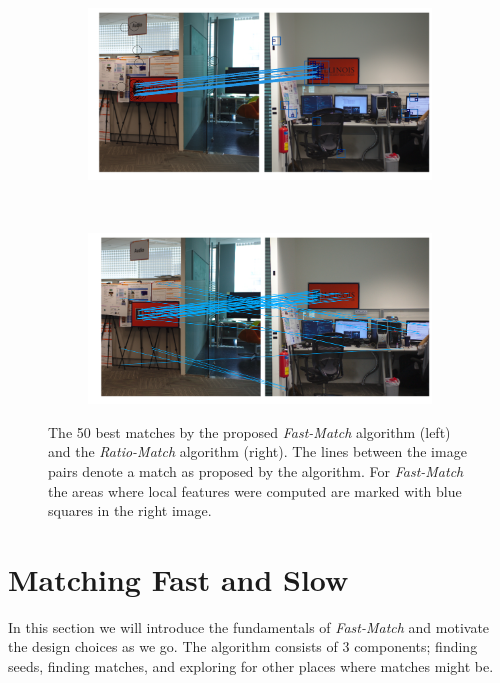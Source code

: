\documentclass[runningheads]{llncs}
\begin{document}
\begin{figure}[tb]
    \centering
    \begin{subfigure}[t]{0.5\columnwidth}
        \includegraphics[width=1\columnwidth]{images/Illinois-fastmatch}
    \end{subfigure}%
    ~%
    \begin{subfigure}[t]{0.5\columnwidth}
        \includegraphics[width=1\columnwidth]{images/Illinois-ratiomatch}
    \end{subfigure}%
    \caption{The 50 best matches by the proposed \emph{Fast-Match} algorithm (left) and the \emph{Ratio-Match} algorithm \cite{lowe2004sift} (right). The lines between the image pairs denote a match as proposed by the algorithm. For \emph{Fast-Match} the areas where local features were computed are marked with blue squares in the right image.}
    \label{fig:match_example}
\end{figure}

\section{Matching Fast and Slow}
\label{algorithm}
%
In this section we will introduce the fundamentals of \emph{Fast-Match} and motivate the design choices as we go. The algorithm consists of 3 components; finding seeds, finding matches, and exploring for other places where matches might be.
\end{document}
